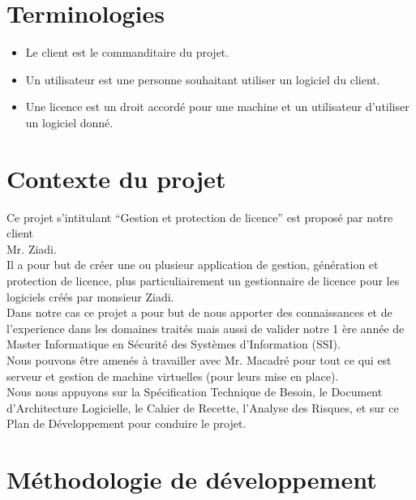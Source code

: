 \chapter{Terminologies}

\begin{itemize}
	\item Le client est le commanditaire du projet.
	\item Un utilisateur est une personne souhaitant utiliser un logiciel du client. 
	\item Une licence est un droit accordé pour une machine et un utilisateur d'utiliser un logiciel donné.
\end{itemize}

\chapter{Contexte du projet}

Ce projet s’intitulant “Gestion et protection de licence” est proposé par notre client \\Mr.
Ziadi.\\\newline Il a pour but de créer une ou plusieur application de gestion, génération et protection 
de licence, plus particuliairement un gestionnaire de licence pour les logiciels créés par monsieur Ziadi.
\\ \newline Dans notre cas ce projet a pour but de nous apporter des connaissances et de l'experience dans les domaines traités
 mais aussi de valider notre 1 ère année de Master Informatique en Sécurité des Systèmes d’Information (SSI).\\ \newline
Nous pouvons être amenés à travailler avec Mr. Macadré pour tout ce qui est
serveur et gestion de machine virtuelles (pour leurs mise en place).\\ Nous
nous appuyons sur la Spécification Technique de Besoin, le Document d'Architecture
Logicielle, le Cahier de Recette, l’Analyse des Risques, et sur ce Plan de Développement
pour conduire le projet.

\chapter{Méthodologie de développement}

